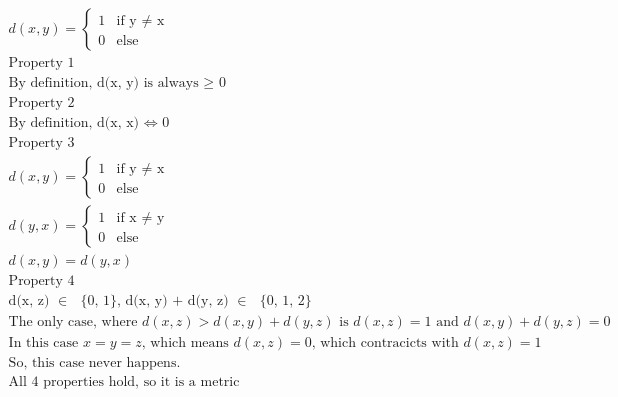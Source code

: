 \documentclass[11pt,a4paper]{scrartcl}
\begin{document}
\subsubsection{} %
\begin{align}
d(x, y) = \begin{cases}
   1 &\text{if y $\neq$ x}\\
   0 &\text{else}
\end{cases}\\
\text{Property 1}\\
\text{By definition, d(x, y) is always $\geq$ 0}\\
\text{Property 2}\\
\text{By definition, d(x, x) $\Leftrightarrow$ 0}\\
\text{Property 3}\\
d(x, y) = \begin{cases}
   1 &\text{if y $\neq$ x}\\
   0 &\text{else}
\end{cases}\\
d(y, x) = \begin{cases}
   1 &\text{if x $\neq$ y}\\
   0 &\text{else}
\end{cases}\\
d(x, y) = d(y, x)\\
\text{Property 4}\\
\text{d(x, z) $\in$ $\{$0, 1$\}$, d(x, y) + d(y, z) $\in$ $\{$0, 1, 2$\}$}\\
\text{The only case, where $d(x, z) > d(x, y) +d(y, z)$ is $d(x, z) =1$ and $d(x, y) + d(y, z) = 0$}\\
\text{In this case $x=y=z$, which means $d(x, z) = 0$, which contracicts with $d(x, z) = 1$}\\
\text{So, this case never happens.}\\
\text{All 4 properties hold, so it is a metric}
\end{align}
\end{document}
